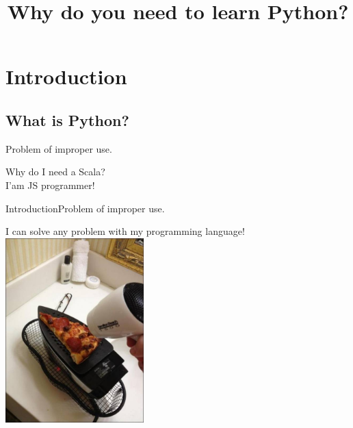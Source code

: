 \documentclass[10pt]{beamer}
\title[Why you need to learn Python?] %
{
	\textbf{Why do you need to learn Python?}
}
\begin{document}
	
{\1%
	\begin{frame} 
		\titlepage
	\end{frame}
}

		
\section{Introduction}

\subsection{What is Python?}


\begin{frame}{Problem of improper use.}
\begin{center}
	\LARGE Why do I need a Scala? \\I'am JS programmer!
\end{center}
\end{frame}

\begin{frame}{Introduction}{Problem of improper use.}
	\begin{center}
		\large{I can solve any problem with my programming language!}
		\includegraphics[width=0.4\textwidth]{pictures/improper.jpg}
	\end{center}
\end{frame}
\end{document}
